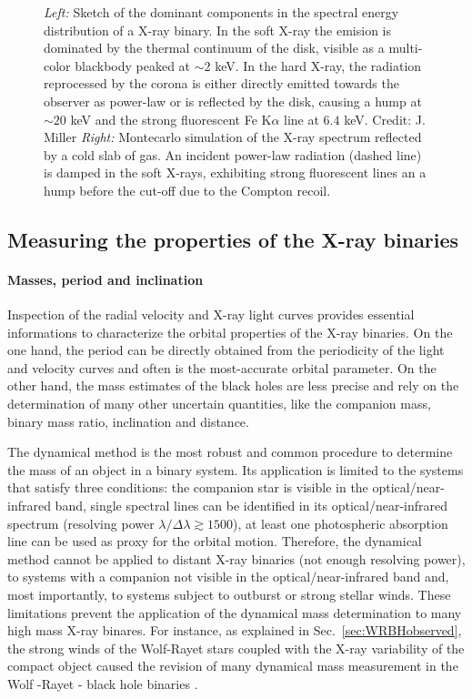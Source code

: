 \documentclass[a4paper,titlepage]{book}     	%
\begin{document}
\begin{figure}
\begin{minipage}{.42\textwidth}
	\end{minipage}
	\caption{\emph{Left:} Sketch of the dominant components in the spectral energy distribution of a X-ray binary. In the soft X-ray the emision is dominated by the thermal continuum of the disk, visible as a multi-color blackbody peaked at $\sim 2$ keV. In the hard X-ray, the radiation reprocessed by the corona is either directly emitted towards the observer as power-law or is reflected by the disk, causing a hump at $\sim 20$ keV and the strong fluorescent Fe K$\alpha$ line at $6.4$ keV. Credit: J. Miller \emph{Right:} Montecarlo simulation of the X-ray spectrum reflected by a cold slab of gas. An incident power-law radiation (dashed line) is damped in the soft X-rays, exhibiting strong fluorescent lines an a hump before the cut-off due to the Compton recoil. \cite{FeKalphaline_Fabian2000}}\label{fig:accretiondisk}
\end{figure}

\subsection{Measuring the properties of the X-ray binaries}\label{subsec:Xraymeasure}
\paragraph{Masses, period and inclination}
Inspection of the radial velocity and X-ray light curves provides essential informations to characterize the orbital properties of the X-ray binaries. On the one hand, the period can be directly obtained from the periodicity of the light and velocity curves and often is the most-accurate orbital parameter. On the other hand, the mass estimates of the black holes are less precise and rely on the determination of many other uncertain quantities, like the companion mass, binary mass ratio, inclination and distance.

The dynamical method is the most robust and common procedure to determine the mass of an object in a binary system. Its application is limited to the systems that satisfy three conditions: the companion star is visible in the optical/near-infrared band, single spectral lines can be identified in its optical/near-infrared spectrum (resolving power $\lambda/\Delta \lambda \gtrsim 1500$), at least one photospheric absorption line can be used as proxy for the orbital motion. Therefore, the dynamical method cannot be applied to distant X-ray binaries (not enough resolving power), to systems with a companion not visible in the optical/near-infrared band and, most importantly, to systems subject to outburst or strong stellar winds. These limitations prevent the application of the dynamical mass determination to many high mass X-ray binares. For instance, as explained in Sec.\ \ref{sec:WRBHobserved}, the strong winds of the Wolf-Rayet stars coupled with the X-ray variability of the compact object caused the revision of many dynamical mass measurement in the Wolf -Rayet - black hole binaries \cite{ICX10X-1_Laycock2015_revisited}.
\end{document}
